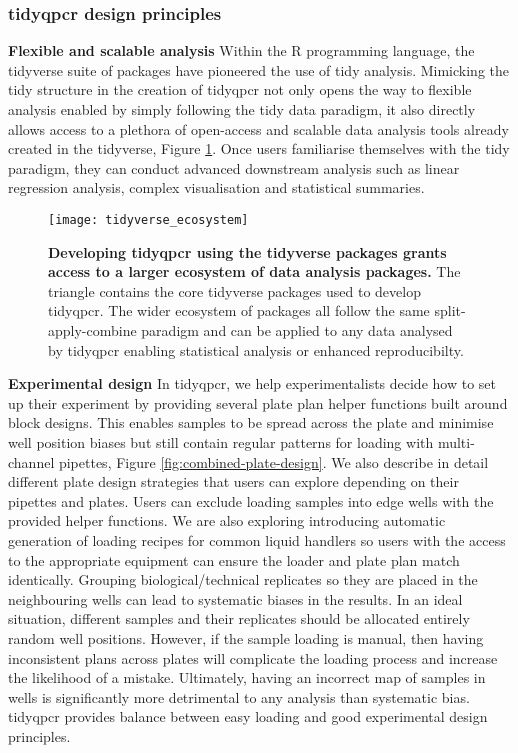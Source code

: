\documentclass[../main.tex]{subfiles}
\begin{document}
\subsubsection{tidyqpcr design principles}


\textbf{Flexible and scalable analysis} Within the R programming language, the tidyverse suite of packages have pioneered the use of tidy analysis. 
Mimicking the tidy structure in the creation of tidyqpcr not only opens the way to flexible analysis enabled by simply following the tidy data paradigm, it also directly allows access to a plethora of open-access and scalable data analysis tools already created in the tidyverse, Figure \ref{fig:tidyverse-ecosystem}. 
Once users familiarise themselves with the tidy paradigm, they can conduct advanced downstream analysis such as linear regression analysis, complex visualisation and statistical summaries. 

\begin{figure}[t]

{\centering \texttt{[image: tidyverse\_ecosystem]} 

}

\caption[Developing tidyqpcr using the tidyverse packages grants access to a larger ecosystem of data analysis packages.]{\textbf{Developing tidyqpcr using the tidyverse packages grants access to a larger ecosystem of data analysis packages.} The triangle contains the core tidyverse packages used to develop tidyqpcr. The wider ecosystem of packages all follow the same split-apply-combine paradigm and can be applied to any data analysed by tidyqpcr enabling statistical analysis or enhanced reproducibilty.}\label{fig:tidyverse-ecosystem}
\end{figure}

\textbf{Experimental design}  In tidyqpcr, we help experimentalists decide how to set up their experiment by providing several plate plan helper functions built around block designs.
This enables samples to be spread across the plate and minimise well position biases but still contain regular patterns for loading with multi-channel pipettes, Figure \ref{fig:combined-plate-design}.
We also describe in detail different plate design strategies that users can explore depending on their pipettes and plates.
Users can exclude loading samples into edge wells with the provided helper functions.
We are also exploring introducing automatic generation of loading recipes for common liquid handlers so users with the access to the appropriate equipment can ensure the loader and plate plan match identically.
Grouping biological/technical replicates so they are placed in the neighbouring wells can lead to systematic biases in the results.
In an ideal situation, different samples and their replicates should be allocated entirely random well positions.
However, if the sample loading is manual, then having inconsistent plans across plates will complicate the loading process and increase the likelihood of a mistake.
Ultimately, having an incorrect map of samples in wells is significantly more detrimental to any analysis than systematic bias.
tidyqpcr provides balance between easy loading and good experimental design principles.
\end{document}
